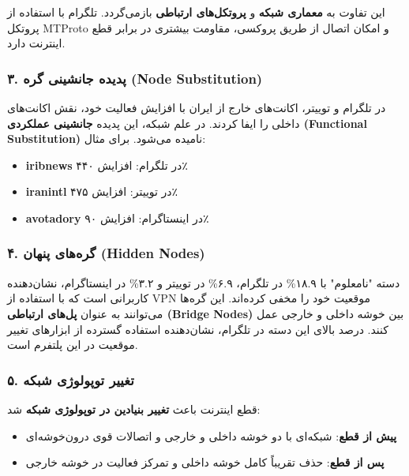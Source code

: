 \documentclass{article}
\begin{document}
		این تفاوت به \textbf{معماری شبکه} و \textbf{پروتکل‌های ارتباطی} بازمی‌گردد. تلگرام با استفاده از پروتکل MTProto و امکان اتصال از طریق پروکسی، مقاومت بیشتری در برابر قطع اینترنت دارد.
		
		\subsubsection*{۳. پدیده جانشینی گره (Node Substitution)}
		در تلگرام و توییتر، اکانت‌های خارج از ایران با افزایش فعالیت خود، نقش اکانت‌های داخلی را ایفا کردند. در علم شبکه، این پدیده \textbf{جانشینی عملکردی (Functional Substitution)} نامیده می‌شود. برای مثال:
		\begin{itemize}
			\item \textbf{iribnews} در تلگرام: افزایش ۴۴۰٪
			\item \textbf{iranintl} در توییتر: افزایش ۴۷۵٪
			\item \textbf{avotadory} در اینستاگرام: افزایش ۹۰٪
		\end{itemize}
		
		\subsubsection*{۴. گره‌های پنهان (Hidden Nodes)}
		دسته "نامعلوم" با ۱۸.۹\% در تلگرام، ۶.۹\% در توییتر و ۳.۲\% در اینستاگرام، نشان‌دهنده کاربرانی است که با استفاده از VPN موقعیت خود را مخفی کرده‌اند. این گره‌ها می‌توانند به عنوان \textbf{پل‌های ارتباطی (Bridge Nodes)} بین خوشه داخلی و خارجی عمل کنند. درصد بالای این دسته در تلگرام، نشان‌دهنده استفاده گسترده از ابزارهای تغییر موقعیت در این پلتفرم است.
		
		\subsubsection*{۵. تغییر توپولوژی شبکه}
		قطع اینترنت باعث \textbf{تغییر بنیادین در توپولوژی شبکه} شد:
		\begin{itemize}
			\item \textbf{پیش از قطع}: شبکه‌ای با دو خوشه داخلی و خارجی و اتصالات قوی درون‌خوشه‌ای
			\item \textbf{پس از قطع}: حذف تقریباً کامل خوشه داخلی و تمرکز فعالیت در خوشه خارجی
		\end{itemize}
		
\end{document}
